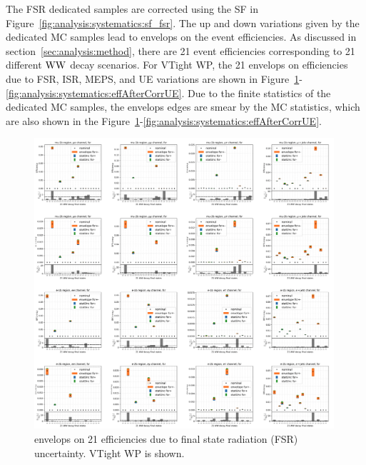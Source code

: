 The FSR dedicated \ttbar samples are corrected using the SF in Figure~\ref{fig:analysis:systematics:sf_fsr}.
The up and down variations given by the dedicated MC samples lead to envelops on the \ttbar event efficiencies.
As discussed in section~\ref{sec:analysis:method}, there are 21 \ttbar event efficiencies corresponding to 21 different
$\mathrm{WW}$ decay scenarios. For VTight WP, the 21 envelops on efficiencies due to FSR, ISR, MEPS, and UE variations are shown in 
Figure~\ref{fig:analysis:systematics:effAfterCorrFSR}-\ref{fig:analysis:systematics:effAfterCorrUE}. 
Due to the finite statistics of the dedicated MC samples, the envelops edges are smear by the MC statistics, 
which are also shown in the Figure~\ref{fig:analysis:systematics:effAfterCorrFSR}-\ref{fig:analysis:systematics:effAfterCorrUE}.


\begin{figure}
    \centering
    \includegraphics[width=0.99\textwidth]{chapters/Analysis/sectionSystematics/figures/ttTheoretical/fsr.png}    
    \caption{envelops on 21 efficiencies due to final state radiation (FSR) uncertainty. VTight WP is shown.}
    \label{fig:analysis:systematics:effAfterCorrFSR}
\end{figure}




